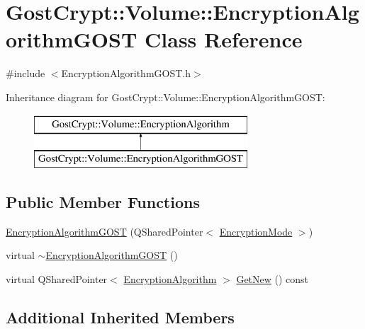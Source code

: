 \hypertarget{class_gost_crypt_1_1_volume_1_1_encryption_algorithm_g_o_s_t}{}\section{Gost\+Crypt\+:\+:Volume\+:\+:Encryption\+Algorithm\+G\+O\+ST Class Reference}
\label{class_gost_crypt_1_1_volume_1_1_encryption_algorithm_g_o_s_t}


{\ttfamily \#include $<$Encryption\+Algorithm\+G\+O\+S\+T.\+h$>$}

Inheritance diagram for Gost\+Crypt\+:\+:Volume\+:\+:Encryption\+Algorithm\+G\+O\+ST\+:\begin{figure}[H]
\begin{center}
\leavevmode
\includegraphics[height=2.000000cm]{class_gost_crypt_1_1_volume_1_1_encryption_algorithm_g_o_s_t}
\end{center}
\end{figure}
\subsection*{Public Member Functions}
\begin{DoxyCompactItemize}
\item 
\hyperlink{class_gost_crypt_1_1_volume_1_1_encryption_algorithm_g_o_s_t_a0da6b29e2d1001901d2f5741d90fe5ad}{Encryption\+Algorithm\+G\+O\+ST} (Q\+Shared\+Pointer$<$ \hyperlink{class_gost_crypt_1_1_volume_1_1_encryption_mode}{Encryption\+Mode} $>$)
\item 
virtual \hyperlink{class_gost_crypt_1_1_volume_1_1_encryption_algorithm_g_o_s_t_a824b1e1e3034fabeaf998923e675b906}{$\sim$\+Encryption\+Algorithm\+G\+O\+ST} ()
\item 
virtual Q\+Shared\+Pointer$<$ \hyperlink{class_gost_crypt_1_1_volume_1_1_encryption_algorithm}{Encryption\+Algorithm} $>$ \hyperlink{class_gost_crypt_1_1_volume_1_1_encryption_algorithm_g_o_s_t_a32ea0c511bbc1e8445ff09c300d2f40b}{Get\+New} () const
\end{DoxyCompactItemize}
\subsection*{Additional Inherited Members}


